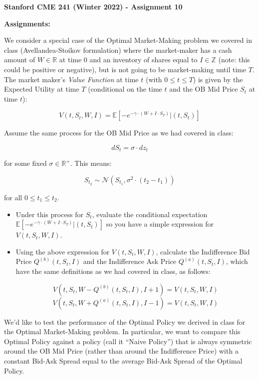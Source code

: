\documentclass[12pt]{exam}
\begin{document}
\begin{center}
{\large {\bf Stanford CME 241 (Winter 2022) - Assignment 10}}
\end{center}
 
{\large{\bf Assignments:}}
\begin{questions}
 We consider a special case of the Optimal Market-Making problem we covered in class (Avellandea-Stoikov formulation) where the market-maker has a cash amount of $W \in \mathbb{R}$ at time 0 and an inventory of shares equal to $I \in \mathbb{Z}$ (note: this could be positive or negative), but is not going to be market-making until time $T$. The market maker's {\em Value Function} at time $t$ (with $0 \leq t \leq T$) is given by the Expected Utility at time $T$ (conditional on the time $t$ and the OB Mid Price $S_t$ at time $t$):

$$V(t, S_t, W, I) = \mathbb{E}[-e^{-\gamma \cdot (W + I \cdot S_T)} | (t, S_t)]$$

Assume the same process for the OB Mid Price as we had covered in class:

$$dS_t = \sigma \cdot dz_t$$

for some fixed $\sigma \in \mathbb{R}^+$. This means:

$$S_{t_2} \sim \mathcal{N}(S_{t_1}, \sigma^2 \cdot (t_2 - t_1))$$

for all $0 \leq t_1 \leq t_2$.

\begin{itemize}
\item Under this process for $S_t$, evaluate the conditional expectation $\mathbb{E}[-e^{-\gamma \cdot (W + I \cdot S_T)} | (t, S_t)]$ so you have a simple expression for $V(t, S_t, W, I)$.
\item Using the above expression for $V(t, S_t, W, I)$, calculate the Indifference Bid Price $Q^{(b)}(t, S_t, I)$ and the Indifference Ask Price $Q^{(a)}(t,S_t,I)$, which have the same definitions as we had covered in class, as follows:

$$V(t,S_t,W - Q^{(b)}(t, S_t, I), I + 1) = V(t,S_t,W, I)$$
$$V(t,S_t,W + Q^{(a)}(t, S_t, I), I - 1) = V(t,S_t,W, I)$$
\end{itemize}

\question We'd like to test the performance of the Optimal Policy we derived in class for the Optimal Market-Making problem. In particular, we want to compare this Optimal Policy against a policy (call it ``Naive Policy'') that is always symmetric around the OB Mid Price (rather than around the Indifference Price) with a constant Bid-Ask Spread equal to the average Bid-Ask Spread of the Optimal Policy.


\end{questions}
\end{document}
